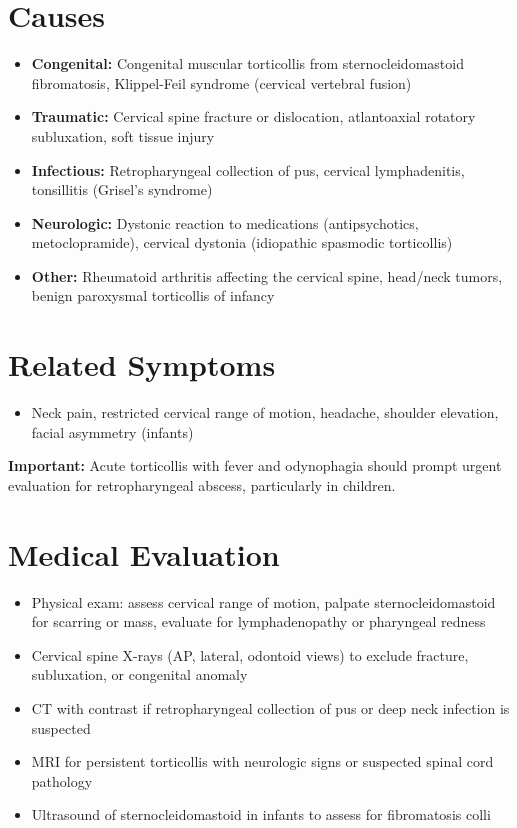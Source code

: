 \section*{Causes}
\begin{itemize}
  \item \textbf{Congenital:} Congenital muscular torticollis from sternocleidomastoid fibromatosis, Klippel-Feil syndrome (cervical vertebral fusion)
  \item \textbf{Traumatic:} Cervical spine fracture or dislocation, atlantoaxial rotatory subluxation, soft tissue injury
  \item \textbf{Infectious:} Retropharyngeal collection of pus, cervical lymphadenitis, tonsillitis (Grisel's syndrome)
  \item \textbf{Neurologic:} Dystonic reaction to medications (antipsychotics, metoclopramide), cervical dystonia (idiopathic spasmodic torticollis)
  \item \textbf{Other:} Rheumatoid arthritis affecting the cervical spine, head/neck tumors, benign paroxysmal torticollis of infancy
\end{itemize}

\section*{Related Symptoms}
\begin{itemize}
  \item Neck pain, restricted cervical range of motion, headache, shoulder elevation, facial asymmetry (infants)
\end{itemize}
\textbf{Important:} Acute torticollis with fever and odynophagia should prompt urgent evaluation for retropharyngeal abscess, particularly in children.

\section*{Medical Evaluation}
\begin{itemize}
  \item Physical exam: assess cervical range of motion, palpate sternocleidomastoid for scarring or mass, evaluate for lymphadenopathy or pharyngeal redness
  \item Cervical spine X-rays (AP, lateral, odontoid views) to exclude fracture, subluxation, or congenital anomaly
  \item CT with contrast if retropharyngeal collection of pus or deep neck infection is suspected
  \item MRI for persistent torticollis with neurologic signs or suspected spinal cord pathology
  \item Ultrasound of sternocleidomastoid in infants to assess for fibromatosis colli
\end{itemize}

